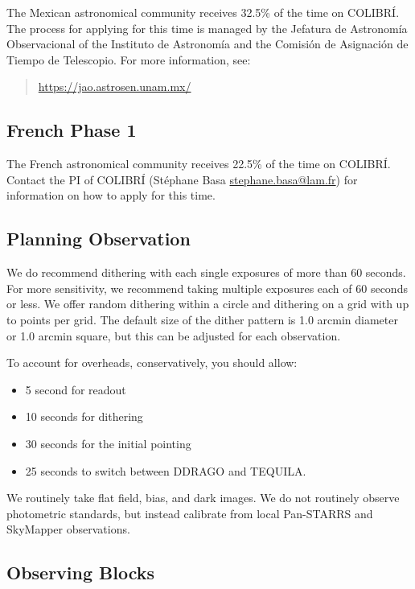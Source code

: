 The Mexican astronomical community receives 32.5\% of the time on COLIBRÍ. The process for applying for this time is managed by the Jefatura de Astronomía Observacional of the Instituto de Astronomía and the Comisión de Asignación de Tiempo de Telescopio. For more information, see:

\begin{quote}
    \url{https://jao.astrosen.unam.mx/}
\end{quote}

\subsection{French Phase 1}

The French astronomical community receives 22.5\% of the time on COLIBRÍ. Contact the PI of COLIBRÍ (Stéphane Basa \href{mailto:sbasa@lam.fr}{stephane.basa@lam.fr}) for information on how to apply for this time.

\subsection{Planning Observation}

We do recommend dithering with each single exposures of more than 60 seconds. For more sensitivity, we recommend taking multiple exposures each of 60 seconds or less. We offer random dithering within a circle and dithering on a grid with up to points per grid. The default size of the dither pattern is 1.0 arcmin diameter or 1.0 arcmin square, but this can be adjusted for each observation.

To account for overheads, conservatively, you should allow:
\begin{itemize}
    \item 5 second for readout
    \item 10 seconds for dithering
    \item 30 seconds for the initial pointing
    \item 25 seconds to switch between DDRAGO and TEQUILA.
\end{itemize}

We routinely take flat field, bias, and dark images. We do not routinely observe photometric standards, but instead calibrate from local Pan-STARRS and SkyMapper observations.

\subsection{Observing Blocks}

